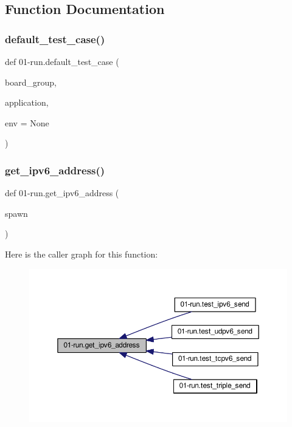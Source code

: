 \subsection{Function Documentation}
\mbox{\label{namespace01-run_ad8f8d1b62f5d6ce614a7956dc3a6ca40}} 
\subsubsection{\texorpdfstring{default\+\_\+test\+\_\+case()}{default\_test\_case()}}
{\footnotesize\ttfamily def 01-\/run.\+default\+\_\+test\+\_\+case (\begin{DoxyParamCaption}\item[{}]{board\+\_\+group,  }\item[{}]{application,  }\item[{}]{env = {\ttfamily None} }\end{DoxyParamCaption})}

\mbox{\label{namespace01-run_afbee4f06ec853d191a2876c017efcdcc}} 
\subsubsection{\texorpdfstring{get\+\_\+ipv6\+\_\+address()}{get\_ipv6\_address()}}
{\footnotesize\ttfamily def 01-\/run.\+get\+\_\+ipv6\+\_\+address (\begin{DoxyParamCaption}\item[{}]{spawn }\end{DoxyParamCaption})}

Here is the caller graph for this function\+:
\nopagebreak
\begin{figure}[H]
\begin{center}
\leavevmode
\includegraphics[width=350pt]{namespace01-run_afbee4f06ec853d191a2876c017efcdcc_icgraph}
\end{center}
\end{figure}
\mbox{\label{namespace01-run_a06344429edc2313358f59b0e501f1ae5}} 
